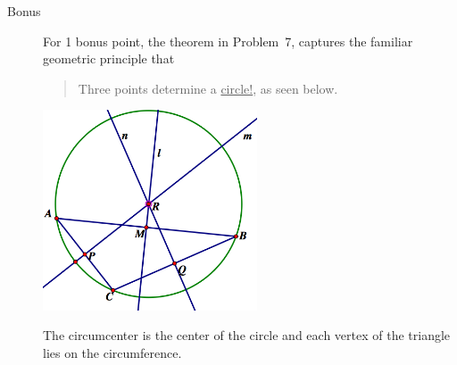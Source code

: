\documentclass[12pt]{article}
\begin{document}
\begin{description}
	\item[Bonus] For 1 bonus point, the theorem in Problem~7, captures the familiar geometric principle that 
	\begin{quote}
	Three points determine a \underline{circle!}, as seen below.
	\end{quote}
\begin{center}\includegraphics[width=2.5in]{last.png}\end{center}
The circumcenter is the center of the circle and each vertex of the triangle lies on the circumference.
\end{description}
\end{document}
